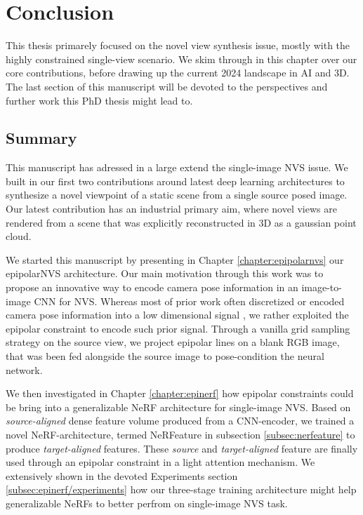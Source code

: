 \chapter{Conclusion}
\label{chapter:conclusion}

{}


This thesis primarely focused on the novel view synthesis issue, mostly with the highly constrained single-view scenario. We skim through in this chapter over our core contributions, before drawing up  the current 2024 landscape in \ac{AI} and 3D. The last section of this manuscript will be devoted to the perspectives and further work this PhD thesis might lead to. 

\section{Summary}

This manuscript has adressed in a large extend the single-image \ac{NVS} issue. We built in our first two contributions around latest deep learning architectures to synthesize a novel viewpoint of a static scene from a single source posed image. Our latest contribution has an industrial primary aim, where novel views are rendered from a scene that was explicitly reconstructed in 3D as a gaussian point cloud.

We started this manuscript by presenting in Chapter \ref{chapter:epipolarnvs} our epipolarNVS architecture. Our main motivation through this work was to propose an innovative way to encode camera pose information in an image-to-image \ac{CNN} for \ac{NVS}. Whereas most of prior work often discretized \citep{kim2020novel} or encoded camera pose information into a low dimensional signal \citep{sun2018multiview}, we rather exploited the epipolar constraint to encode such prior signal. Through a vanilla grid sampling strategy on the source view, we project epipolar lines on a blank RGB image, that was been fed alongside the source image to pose-condition the neural network. 

We then investigated in Chapter \ref{chapter:epinerf} how epipolar constraints could be bring into a generalizable \ac{NeRF} architecture for single-image \ac{NVS}. Based on \textit{source-aligned} dense feature volume produced from a CNN-encoder, we trained a novel \ac{NeRF}-architecture, termed NeRFeature in subsection \ref{subsec:nerfeature} to produce \textit{target-aligned} features. These \textit{source} and \textit{target-aligned} feature are finally used through an epipolar constraint in a light attention mechanism. We extensively shown in the devoted Experiments section \ref{subsec:epinerf/experiments} how our three-stage training architecture might help generalizable \ac{NeRF}s to better perfrom on single-image \ac{NVS} task.  

